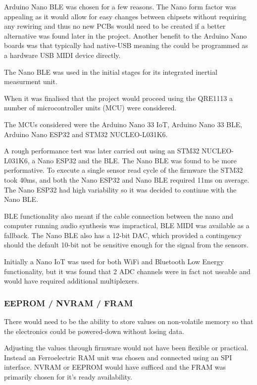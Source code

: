 Arduino Nano BLE was chosen for a few reasons. The Nano form factor was
appealing as it would allow for easy changes between chipsets without
requiring any rewiring and thus no new PCBs would need to be created if
a better alternative was found later in the project. Another benefit to
the Arduino Nano boards was that typically had native-USB meaning the
could be programmed as a hardware USB MIDI device directly.

The Nano BLE was used in the initial stages for its integrated inertial measurment unit.

When it was finalised that the project would proceed using the QRE1113 a
number of microcontroller units (MCU) were considered.

The MCUs considered were the Arduino Nano 33 IoT, Arduino Nano 33 BLE,
Arduino Nano ESP32 and STM32 NUCLEO-L031K6.

A rough performance test was later carried out using an STM32
NUCLEO-L031K6, a Nano ESP32 and the BLE. The Nano BLE was found to be
more performative. To execute a single sensor read cycle of the firmware
the STM32 took 40ms, and both the Nano ESP32 and Nano BLE required 11ms
on average. The Nano ESP32 had high variability so it was decided to
continue with the Nano BLE. 


BLE functionality also meant if the cable connection between the nano
and computer running audio synthesis was impractical, BLE MIDI was
available as a fallback. The Nano BLE also has a 12-bit DAC, which
provided a contingency should the default 10-bit not be sensitive enough
for the signal from the sensors.

Initially a Nano IoT was used for both WiFi and Bluetooth Low Energy
functionality, but it was found that 2 ADC channels were in fact not
useable and would have required additional multiplexers.

\subsubsection{EEPROM / NVRAM / FRAM}\label{eeprom-nvram-fram}

There would need to be the ability to store values on non-volatile
memory so that the electronics could be powered-down without losing
data.

Adjusting the values through firmware would not have been flexible or
practical. Instead an Ferroelectric RAM unit was chosen and connected
using an SPI interface. NVRAM or EEPROM would have sufficed and the FRAM
was primarily chosen for it's ready availability.


